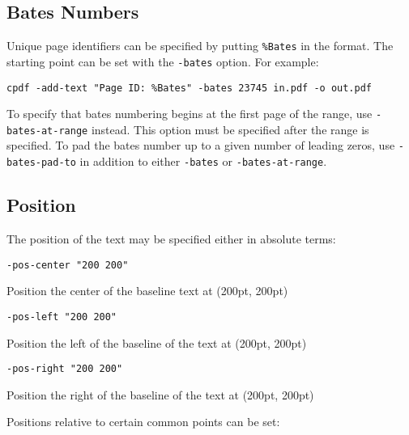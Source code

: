 \documentclass{book}
\begin{document}
  \subsection{Bates Numbers}
  Unique page identifiers can be specified by putting \verb!%Bates! in the format.
The starting point can be set with the \texttt{-bates} option. For example:
  \begin{framed}
    \small\verb!cpdf -add-text "Page ID: %Bates" -bates 23745 in.pdf -o out.pdf!
  \end{framed}

To specify that bates numbering begins at the first page of the range, use \texttt{-bates-at-range} instead. This option must be specified after the range is specified. To pad the bates number up to a given number of leading zeros, use \texttt{-bates-pad-to} in addition to either \texttt{-bates} or \texttt{-bates-at-range}.



  \subsection{Position}
  \label{position}
  The position of the text may be specified either in absolute terms:
  \begin{framed}
    \small\verb!-pos-center "200 200"!
  
    \vspace{2.5mm}
    \noindent Position the center of the baseline text at (200pt, 200pt)

    \vspace{2.5mm}
    \small\verb!-pos-left "200 200"!
  
    \vspace{2.5mm}
    \noindent Position the left of the baseline of the text at (200pt, 200pt)

    \vspace{2.5mm}
    \small\verb!-pos-right "200 200"!
  
    \vspace{2.5mm}
    \noindent Position the right of the baseline of the text at (200pt, 200pt)

  \end{framed}

  \noindent Positions relative to certain common points can be set:
\end{document}
